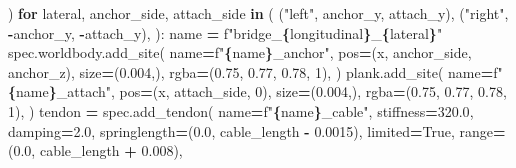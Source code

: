 \documentclass[
  chinese,
  11pt,
  letterpaper,
]{article}
\newenvironment{Shaded}{\begin{snugshade}}{\end{snugshade}}
\newcommand{\BuiltInTok}[1]{#1}
\newcommand{\ControlFlowTok}[1]{\textcolor[rgb]{0.13,0.29,0.53}{\textbf{#1}}}
\newcommand{\DecValTok}[1]{\textcolor[rgb]{0.00,0.00,0.81}{#1}}
\newcommand{\FloatTok}[1]{\textcolor[rgb]{0.00,0.00,0.81}{#1}}
\newcommand{\KeywordTok}[1]{\textcolor[rgb]{0.13,0.29,0.53}{\textbf{#1}}}
\newcommand{\NormalTok}[1]{#1}
\newcommand{\OperatorTok}[1]{\textcolor[rgb]{0.81,0.36,0.00}{\textbf{#1}}}
\newcommand{\SpecialCharTok}[1]{\textcolor[rgb]{0.81,0.36,0.00}{\textbf{#1}}}
\newcommand{\SpecialStringTok}[1]{\textcolor[rgb]{0.31,0.60,0.02}{#1}}
\newcommand{\StringTok}[1]{\textcolor[rgb]{0.31,0.60,0.02}{#1}}
\newcommand{\VariableTok}[1]{\textcolor[rgb]{0.00,0.00,0.00}{#1}}
\renewenvironment{Shaded}{\par\smallskip}{\par\smallskip}
\begin{document}
\begin{Shaded}
\begin{Highlighting}[]
\NormalTok{            )}
        \ControlFlowTok{for}\NormalTok{ lateral, anchor\_side, attach\_side }\KeywordTok{in}\NormalTok{ (}
\NormalTok{            (}\StringTok{"left"}\NormalTok{, anchor\_y, attach\_y),}
\NormalTok{            (}\StringTok{"right"}\NormalTok{, }\OperatorTok{{-}}\NormalTok{anchor\_y, }\OperatorTok{{-}}\NormalTok{attach\_y),}
\NormalTok{        ):}
\NormalTok{            name }\OperatorTok{=} \SpecialStringTok{f"bridge\_}\SpecialCharTok{\{}\NormalTok{longitudinal}\SpecialCharTok{\}}\SpecialStringTok{\_}\SpecialCharTok{\{}\NormalTok{lateral}\SpecialCharTok{\}}\SpecialStringTok{"}
\NormalTok{            spec.worldbody.add\_site(}
\NormalTok{                name}\OperatorTok{=}\SpecialStringTok{f"}\SpecialCharTok{\{}\NormalTok{name}\SpecialCharTok{\}}\SpecialStringTok{\_anchor"}\NormalTok{,}
\NormalTok{                pos}\OperatorTok{=}\NormalTok{(x, anchor\_side, anchor\_z),}
\NormalTok{                size}\OperatorTok{=}\NormalTok{(}\FloatTok{0.004}\NormalTok{,),}
\NormalTok{                rgba}\OperatorTok{=}\NormalTok{(}\FloatTok{0.75}\NormalTok{, }\FloatTok{0.77}\NormalTok{, }\FloatTok{0.78}\NormalTok{, }\DecValTok{1}\NormalTok{),}
\NormalTok{            )}
\NormalTok{            plank.add\_site(}
\NormalTok{                name}\OperatorTok{=}\SpecialStringTok{f"}\SpecialCharTok{\{}\NormalTok{name}\SpecialCharTok{\}}\SpecialStringTok{\_attach"}\NormalTok{,}
\NormalTok{                pos}\OperatorTok{=}\NormalTok{(x, attach\_side, }\DecValTok{0}\NormalTok{),}
\NormalTok{                size}\OperatorTok{=}\NormalTok{(}\FloatTok{0.004}\NormalTok{,),}
\NormalTok{                rgba}\OperatorTok{=}\NormalTok{(}\FloatTok{0.75}\NormalTok{, }\FloatTok{0.77}\NormalTok{, }\FloatTok{0.78}\NormalTok{, }\DecValTok{1}\NormalTok{),}
\NormalTok{            )}
\NormalTok{            tendon }\OperatorTok{=}\NormalTok{ spec.add\_tendon(}
\NormalTok{                name}\OperatorTok{=}\SpecialStringTok{f"}\SpecialCharTok{\{}\NormalTok{name}\SpecialCharTok{\}}\SpecialStringTok{\_cable"}\NormalTok{,}
\NormalTok{                stiffness}\OperatorTok{=}\FloatTok{320.0}\NormalTok{,}
\NormalTok{                damping}\OperatorTok{=}\FloatTok{2.0}\NormalTok{,}
\NormalTok{                springlength}\OperatorTok{=}\NormalTok{(}\FloatTok{0.0}\NormalTok{, cable\_length }\OperatorTok{{-}} \FloatTok{0.0015}\NormalTok{),}
\NormalTok{                limited}\OperatorTok{=}\VariableTok{True}\NormalTok{,}
                \BuiltInTok{range}\OperatorTok{=}\NormalTok{(}\FloatTok{0.0}\NormalTok{, cable\_length }\OperatorTok{+} \FloatTok{0.008}\NormalTok{),}

\end{Highlighting}
\end{Shaded}
\end{document}
